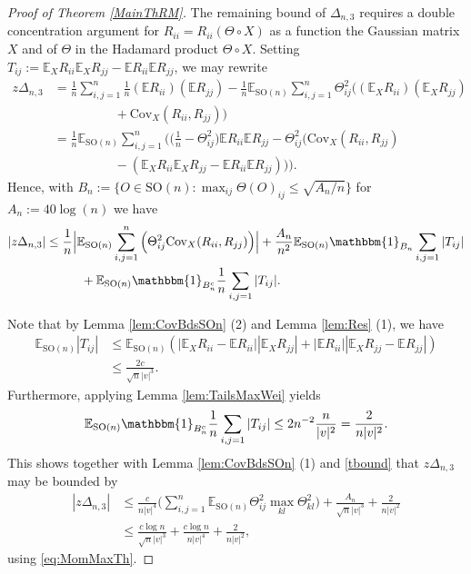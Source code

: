 \documentclass[a4paper,12pt]{amsart}
\numberwithin{equation}{section}
\theoremstyle{remark}
\def\E{{\mathbb E}}
\begin{document}
\begin{proof}[Proof of Theorem \ref{MainThRM}]
The remaining bound of $\Delta_{n,3}$ requires a double concentration argument for $R_{ii}=R_{ii}(\Theta \circ X)$$ $ as a function the Gaussian matrix $X$ and of $\Theta$ in the Hadamard product $\Theta \circ X$. Setting $T_{ij}:= \E_X R_{ii} \E_X R_{jj} - \E R_{ii} \E R_{jj}$, we may rewrite
\begin{align*}
z \Delta_{n,3} &= \frac{1} {n} \sum_{i,j=1}^n \frac{1} {n} (\E R_{ii}) (\E R_{jj}) -  \frac 1 { n} \E_{\mathrm{SO}(n)} \sum_{i,j=1}^n \Theta_{ij}^2 \Big((\E_X R_{ii}) (\E_X R_{jj})\\
&\hspace{2cm}+\mathrm{Cov}_X(R_{ii},  R_{jj})\Big)\\
& =  \frac{1} {n} \E_{\mathrm{SO}(n)}\sum_{i,j=1}^n \Big( \Big(\frac{1} {n}- \Theta_{ij}^2 \Big) \E R_{ii} \E R_{jj} -  \Theta_{ij}^2 \Big(\mathrm{Cov}_X(R_{ii},  R_{jj})\\
&\hspace{2cm}- (\E_X R_{ii} \E_X R_{jj} - \E R_{ii} \E R_{jj})\Big)\Big).
\end{align*}
Hence, with $B_n:=\{ O \in \mathrm{SO}(n) \colon \max_{ij}\Theta(O)_{ij} \le \sqrt{A_n/n} \}$ for $A_n:= 40\log(n)$ we have
\begin{align*}
|z \Delta_{n,3}| &\le  \frac{1} {n} \Big|\E_{\mathrm{SO}(n)} \sum_{i,j=1}^n \Big( \Theta_{ij}^2 \mathrm{Cov}_X(R_{ii},  R_{jj})\Big) \Big|  + \frac {A_n} { n^2} \E_{\mathrm{SO}(n)}  \mathbbm{1}_{B_n}  \sum_{i,j=1} |T_{ij}|\\
&\hspace{1cm} + \E_{\mathrm{SO}(n)} \mathbbm{1}_{B_n^c} \frac 1 n \sum_{i,j=1} |T_{ij}|.  
\end{align*}

Note that by Lemma \ref{lem:CovBdsSOn} (2) and Lemma \ref{lem:Res} (1), we have
\begin{align}
\E_{\mathrm{SO}(n)} |T_{ij}| &\le \E_{\mathrm{SO}(n)} (|\E_X R_{ii} - \E R_{ii}| |\E_X R_{jj}| + |\E R_{ii}| |\E_X R_{jj} - \E R_{jj}| )\nonumber \\
 &\le \frac{2 c}{\sqrt{n} |v|^3 }.\label{tbound}
 \end{align}
Furthermore, applying Lemma \ref{lem:TailsMaxWei} yields
\[
\E_{\mathrm{SO}(n)} \mathbbm{1}_{B_n^c} \frac 1 n \sum_{i,j=1} |T_{ij}|\le  2 n^{-2} \frac{n}{|v|^2} =  \frac{2}{n |v|^2}.
\]
This shows together with Lemma \ref{lem:CovBdsSOn} (1) and \eqref{tbound} that $z \Delta_{n,3}$ may be bounded by
\begin{align*}
 |z \Delta_{n,3}| &\le \frac c { n |v|^4}\Big(\sum_{i,j=1}^n  \E_{\mathrm{SO}(n)} \Theta_{ij}^2 \max_{kl}\Theta_{kl}^2\Big) + \frac{A_n} {\sqrt{n} |v|^3 } + \frac{2}{n |v|^2} \\
 &\le \frac {c \log n} {\sqrt{n}  |v|^3} + \frac {c \log n} { n |v|^4} + \frac{2}{n |v|^2} , 
\end{align*}
using \eqref{eq:MomMaxTh}.


\end{proof}
\end{document}
